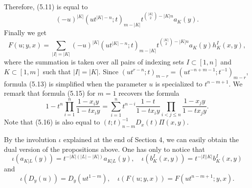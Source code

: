 Therefore, (5.11) is equal to
$$
(-u)^{|K|} (ut^{|K|-n};t)_{m-|K|} t^{\binom{|K|}{2}-|K|n } a_{K}(y).
\tag{5.12}
$$
Finally we get
$$
F(u;y,x)
=\sum_{|I|=|K|} 
(-u)^{|K|} (ut^{|K|-n};t)_{m-|K|} t^{\binom{|K|}{2}-|K|n }
a_{K}(y) h^{I}_{K}(x,y),
\tag{5.13}
$$
where the summation is taken over all pairs of indexing sets
$I\subset[1,n]$ and 
$K\subset{[1,m]}$  such that $|I|=|K|$. 
Since $(ut^{r-n};t)_{m-r}=(ut^{-n+m-1};t^{-1})_{m-r}$, 
formula (5.13) is simplified when the parameter $u$ 
is specialized to $t^{n-m+1}$. 
%
\noindent
We remark that formula (5.15) for $m=1$ recovers the formula
$$
1-t^n\prod_{i=1}^n\frac{1-x_iy}{1-tx_iy}=
\sum_{i=1}^n t^{n-i}\frac{1-t}{1-tx_iy} \prod_{i<j\le n}\frac{1-x_jy}{1-tx_jy}.
\tag{5.17}
$$
Note that (5.16) is also equal to $(t;t)_{n-m}^{-1} D_x(t) \Pi(x,y)$.
%
\par\medpagebreak\par
By the involution $\iota$ explained at the end of Section 4, 
we can easily obtain the dual version of the propositions above.  
One has only to notice that 
$$
\iota(a_{K|L}(y))=t^{-|K|(|L|-|K|)} a_{K|L}(y), \quad
\iota(b^I_K(x,y))=t^{-|I||K|} b^I_K(x,y) 
\tag{5.18}
$$
and
$$
\iota(D_y(u))=D_y(ut^{1-m}),\quad
\iota(F(u;y,x))=F(ut^{n-m+1};y,x). 
\tag{5.19}
$$
%
